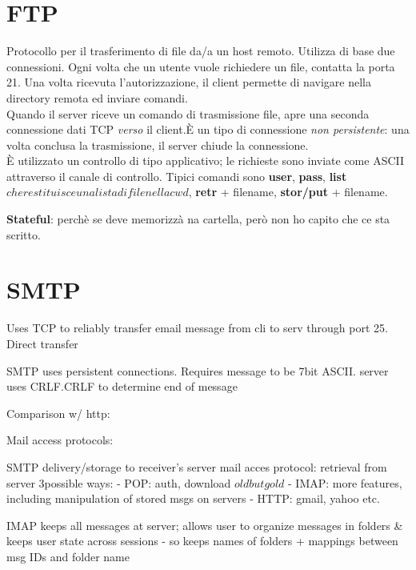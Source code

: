 \section{FTP}
Protocollo per il trasferimento di file da/a un host remoto.
Utilizza di base due connessioni. Ogni volta che un utente vuole richiedere un file, contatta la porta 21. Una volta ricevuta l'autorizzazione, il client permette di navigare nella directory remota ed inviare comandi. \\
Quando il server riceve un comando di trasmissione file, apre una seconda connessione dati TCP \textit{verso} il client.È un tipo di connessione \textit{non persistente}: una volta conclusa la trasmissione, il server chiude la connessione. \\
È utilizzato un controllo di tipo applicativo; le richieste sono inviate come ASCII attraverso il canale di controllo.
Tipici comandi sono \textbf{user}, \textbf{pass}, \textbf{list} \(che restituisce una lista di file nella cwd\), \textbf{retr} + filename, \textbf{stor/put} + filename. 



\textbf{Stateful}: perchè se deve memorizzà na cartella, però non ho capito che ce sta scritto.

\section{SMTP}
Uses TCP to reliably transfer email message from cli to serv through port 25.
Direct transfer %

SMTP uses persistent connections.
Requires message to be 7bit ASCII.
server uses CRLF.CRLF to determine end of message

Comparison w/ http:

Mail access protocols:

SMTP delivery/storage to receiver's server
mail acces protocol: retrieval from server
3possible ways:
	- POP: auth, download \(old but gold\)
	- IMAP: more features, including manipulation of stored msgs on servers
	- HTTP: gmail, yahoo etc.

IMAP keeps all messages at server; allows user to organize messages in folders \& keeps user state across sessions - so keeps names of folders + mappings between msg IDs and folder name